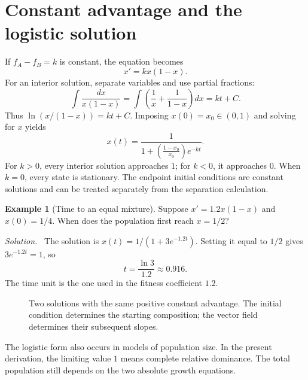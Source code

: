 \documentclass[11pt,oneside,openany]{book}
\theoremstyle{definition}
\newtheorem{example}{Example}[chapter]
\theoremstyle{remark}
\newenvironment{solution}{\par\smallskip\noindent\textit{Solution.}\ }{\par\smallskip}
\numberwithin{equation}{chapter}
\begin{document}
\section{Constant advantage and the logistic solution}
If $f_A-f_B=k$ is constant, the equation becomes
\[
x'=kx(1-x).
\]
For an interior solution, separate variables and use partial fractions:
\[
\int\frac{dx}{x(1-x)}=\int\left(\frac1x+\frac1{1-x}\right)dx=kt+C.
\]
Thus $\ln(x/(1-x))=kt+C$. Imposing $x(0)=x_0\in(0,1)$ and solving for $x$ yields
\begin{equation}\label{eq:logisticsolution}
\boxed{x(t)=\frac{1}{1+\left(\frac{1-x_0}{x_0}\right)e^{-kt}}.}
\end{equation}
For $k>0$, every interior solution approaches $1$; for $k<0$, it approaches $0$. When $k=0$, every state is stationary. The endpoint initial conditions are constant solutions and can be treated separately from the separation calculation.

\begin{example}[Time to an equal mixture]
Suppose $x'=1.2x(1-x)$ and $x(0)=1/4$. When does the population first reach $x=1/2$?
\begin{solution}
The solution is $x(t)=1/(1+3e^{-1.2t})$. Setting it equal to $1/2$ gives $3e^{-1.2t}=1$, so
\[
t=\frac{\ln3}{1.2}\approx0.916.
\]
The time unit is the one used in the fitness coefficient $1.2$.
\end{solution}
\end{example}

\begin{figure}[htbp]
\centering
{}
\caption{Two solutions with the same positive constant advantage. The initial condition determines the starting composition; the vector field determines their subsequent slopes.}
\end{figure}

The logistic form also occurs in models of population size. In the present derivation, the limiting value $1$ means complete relative dominance. The total population still depends on the two absolute growth equations.
\end{document}
